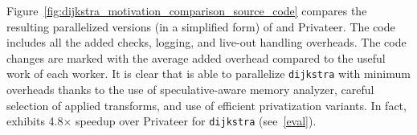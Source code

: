 

Figure~\ref{fig:dijkstra_motivation_comparison_source_code} compares the
resulting parallelized versions (in a simplified form) of \name and
Privateer. The code includes all the added checks, logging, and live-out
handling overheads. The code changes are marked with the average added
overhead compared to the useful work of each worker. It is clear that \name is
able to parallelize \texttt{dijkstra} with minimum overheads thanks to the
use of speculative-aware memory analyzer, careful selection of applied
transforms, and use of efficient privatization variants. In fact,
\name exhibits 4.8$\times$ speedup over Privateer for \texttt{dijkstra}
(see~\cref{eval}).

%
%
%
%
%
%
